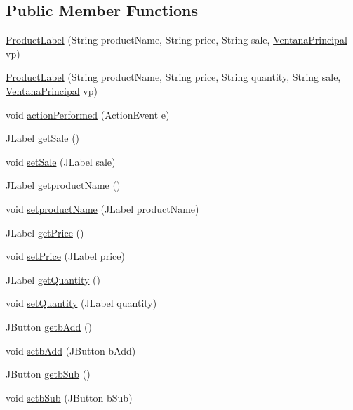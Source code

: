 \subsection*{Public Member Functions}
\begin{DoxyCompactItemize}
\item 
\mbox{\hyperlink{class_s_p_q_1_1gui_1_1component_1_1_product_label_a39cba3384790cdbcb8dc6d9e60d01196}{Product\+Label}} (String product\+Name, String price, String sale, \mbox{\hyperlink{class_s_p_q_1_1gui_1_1_ventana_principal}{Ventana\+Principal}} vp)
\item 
\mbox{\hyperlink{class_s_p_q_1_1gui_1_1component_1_1_product_label_ad2a715926b802401b162793f217a26f7}{Product\+Label}} (String product\+Name, String price, String quantity, String sale, \mbox{\hyperlink{class_s_p_q_1_1gui_1_1_ventana_principal}{Ventana\+Principal}} vp)
\item 
void \mbox{\hyperlink{class_s_p_q_1_1gui_1_1component_1_1_product_label_aba8c2a34cc8626f5edb81a88e3fc0e9f}{action\+Performed}} (Action\+Event e)
\item 
J\+Label \mbox{\hyperlink{class_s_p_q_1_1gui_1_1component_1_1_product_label_a7841fcd56578df74918d99fa2b705e24}{get\+Sale}} ()
\item 
void \mbox{\hyperlink{class_s_p_q_1_1gui_1_1component_1_1_product_label_a787ff03a48344b80ecb10a3717474cde}{set\+Sale}} (J\+Label sale)
\item 
J\+Label \mbox{\hyperlink{class_s_p_q_1_1gui_1_1component_1_1_product_label_a614cfb4f7e9b89e21e7225ac7c93ef2c}{getproduct\+Name}} ()
\item 
void \mbox{\hyperlink{class_s_p_q_1_1gui_1_1component_1_1_product_label_a820888bdd1a4f5edc81d5a04c29fe31d}{setproduct\+Name}} (J\+Label product\+Name)
\item 
J\+Label \mbox{\hyperlink{class_s_p_q_1_1gui_1_1component_1_1_product_label_a55d169a1939b34ba4c7899daa6b779f6}{get\+Price}} ()
\item 
void \mbox{\hyperlink{class_s_p_q_1_1gui_1_1component_1_1_product_label_a85cc995e0b174583ec6eb7ff075d0f46}{set\+Price}} (J\+Label price)
\item 
J\+Label \mbox{\hyperlink{class_s_p_q_1_1gui_1_1component_1_1_product_label_adcfdea4cb072291bea24728bf75aac10}{get\+Quantity}} ()
\item 
void \mbox{\hyperlink{class_s_p_q_1_1gui_1_1component_1_1_product_label_a04b7651edaba15127338d27e9be013e7}{set\+Quantity}} (J\+Label quantity)
\item 
J\+Button \mbox{\hyperlink{class_s_p_q_1_1gui_1_1component_1_1_product_label_a3651b381b7b22f996108134d4a7c7251}{getb\+Add}} ()
\item 
void \mbox{\hyperlink{class_s_p_q_1_1gui_1_1component_1_1_product_label_ac3981c38ea018be3253d133cd1da8b83}{setb\+Add}} (J\+Button b\+Add)
\item 
J\+Button \mbox{\hyperlink{class_s_p_q_1_1gui_1_1component_1_1_product_label_ab2fd1c3e4990adff5c81f99123197ad1}{getb\+Sub}} ()
\item 
void \mbox{\hyperlink{class_s_p_q_1_1gui_1_1component_1_1_product_label_a1d3899db7326042feaa04a482a86ee8e}{setb\+Sub}} (J\+Button b\+Sub)
\end{DoxyCompactItemize}


